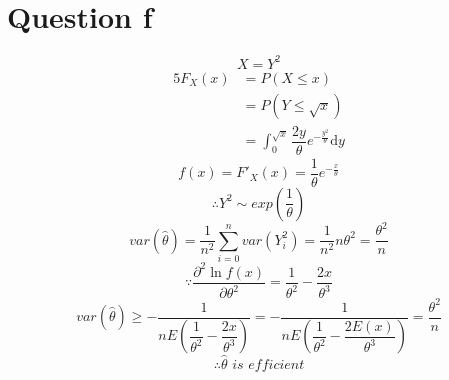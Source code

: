 \documentclass[a4papers]{ctexart}
\begin{document}
\section*{Question f}
\[X=Y^2\]
\begin{alignat*}{5}
    F_X(x)&=P(X\le x)\\
    &=P(Y\le \sqrt{x})\\
    &=\int_0^{\sqrt{x}} \dfrac{2y}{\theta}e^{-\frac{y^2}{\theta}}\mathrm{d}y
\end{alignat*}
\[  f(x)=F'_X(x)=\dfrac{1}{\theta}e^{-\frac{x}{\theta}}\]
\[\therefore Y^2 \sim exp\left(\dfrac{1}{\theta}\right)\]
\[ var(\hat{\theta}) = \dfrac{1}{n^2}\sum_{i=0}^n var(Y_i^2)=\dfrac{1}{n^2}n\theta^2 = \dfrac{\theta^2}{n}\]
\[\because \dfrac {\partial ^{2}\ln f\left( x\right) }{\partial \theta ^{2}}=\dfrac {1}{\theta ^{2}}-\dfrac {2x}{\theta ^{3}}\]
\[var(\hat{\theta}) \ge -\dfrac{1}{nE(\dfrac {1}{\theta ^{2}}-\dfrac {2x}{\theta ^{3}})}
= -\dfrac{1}{nE\left(\dfrac {1}{\theta ^{2}}-\dfrac {2E(x)}{\theta ^{3}}\right)} =\dfrac{\theta^2}{n}\]
\[\therefore \hat{\theta}\,\, is\,\, efficient\]
\end{document}
